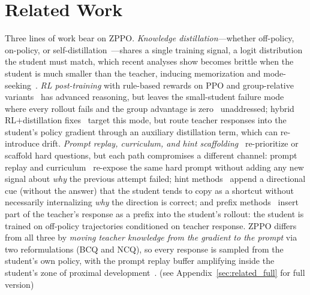 \documentclass{llmxive}
\begin{document}
\section{Related Work}
\label{sec:related}
Three lines of work bear on ZPPO. \emph{Knowledge distillation}—whether off-policy, on-policy, or self-distillation~\citep{gou2021knowledge,ko2024distillm,agarwal2024policy,lu2025onpolicydistillation,zelikman2022star,shenfeld2026self}—shares a single training signal, a logit distribution the student must match, which recent analyses show becomes brittle when the student is much smaller than the teacher, inducing memorization and mode-seeking~\citep{kim2026does,li2026rethinking,song2026survey}. \emph{RL post-training} with rule-based rewards on PPO and group-relative variants~\citep{schulman2017proximal,shao2024deepseekmath,yu2025dapo,guo2025deepseek} has advanced reasoning, but leaves the small-student failure mode where every rollout fails and the group advantage is zero~\citep{yu2025dapo} unaddressed; hybrid RL$+$distillation fixes~\citep{xu2025kdrl,xu2026rlkd} target this mode, but route teacher responses into the student's policy gradient through an auxiliary distillation term, which can re-introduce drift. \emph{Prompt replay, curriculum, and hint scaffolding}~\citep{zhan2025exgrpo,zhang2025rlep,zhang2025clpo,zhang2025stephint,zhang2025bread,li2025staying} re-prioritize or scaffold hard questions, but each path compromises a different channel: prompt replay and curriculum~\citep{zhan2025exgrpo,zhang2025rlep,zhang2025clpo} re-expose the same hard prompt without adding any new signal about \emph{why} the previous attempt failed; hint methods~\citep{li2025staying} append a directional cue (without the answer) that the student tends to copy as a shortcut without necessarily internalizing \emph{why} the direction is correct; and prefix methods~\citep{zhang2025stephint,zhang2025bread} insert part of the teacher's response as a prefix into the student's rollout: the student is trained on off-policy trajectories conditioned on teacher response. ZPPO differs from all three by \emph{moving teacher knowledge from the gradient to the prompt} via two reformulations (BCQ and NCQ), so every response is sampled from the student's own policy, with the prompt replay buffer amplifying inside the student's zone of proximal development~\citep{vygotsky1978mind}. (see Appendix~\ref{sec:related_full} for full version)
\end{document}
